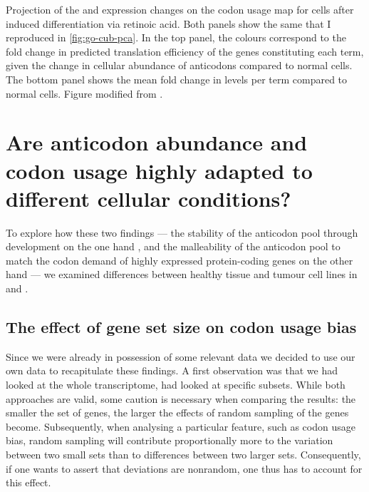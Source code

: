     {Projection of the \trna and \mrna expression changes on the codon usage
    map for cells after induced differentiation via retinoic acid.}
    {Both panels show the same \pca that I reproduced in \cref{fig:go-cub-pca}.
    In the top panel, the colours correspond to the fold change in predicted
    translation efficiency of the genes constituting each \go term, given the
    change in cellular abundance of \trna anticodons compared to normal cells.
    The bottom panel shows the mean fold change in \mrna levels per \go term
    compared to normal cells. Figure modified from \citet{Gingold:2014}.}

\section{Are  anticodon abundance and codon usage highly adapted to
different cellular conditions?}

To explore how these two findings — the stability of the anticodon pool through
development on the one hand \citep{Schmitt:2014}, and the malleability of the
anticodon pool to match the codon demand of highly expressed protein-coding
genes on the other hand \citep{Gingold:2014} — we examined differences between
healthy tissue and tumour cell lines in \mmu and \hsa.

\subsection{The effect of gene set size on codon usage bias}

Since we were already in possession of some relevant \trna data we decided to
use our own data to recapitulate these findings. A first observation was that we
had looked at the whole transcriptome, \citet{Gingold:2014} had looked at
specific subsets. While both approaches are valid, some caution is necessary
when comparing the results: the smaller the set of genes, the larger the effects
of random sampling of the genes become. Subsequently, when analysing a
particular feature, such as codon usage bias, random sampling will contribute
proportionally more to the variation between two small sets than to differences
between two larger sets. Consequently, if one wants to assert that deviations
are nonrandom, one thus has to account for this effect.

